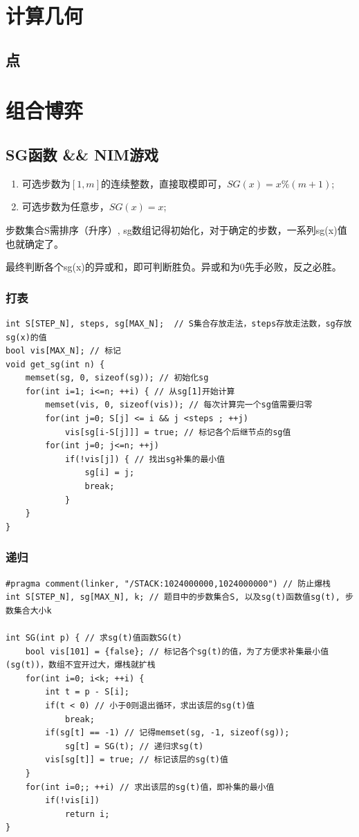 \documentclass[a4paper]{ctexrep}
\begin{document}
\chapter{计算几何}
\section{点}


\chapter{组合博弈}
\section{SG函数 \&\& NIM游戏}
\begin{enumerate}
	\item 可选步数为$[1, m]$的连续整数，直接取模即可，$SG(x)=x\%(m+1)$;
	\item 可选步数为任意步，$SG(x)=x$;
\end{enumerate}

步数集合S需排序（升序）, sg数组记得初始化，对于确定的步数，一系列sg(x)值也就确定了。

最终判断各个sg(x)的异或和，即可判断胜负。异或和为0先手必败，反之必胜。

\subsection{打表}
\begin{lstlisting}
int S[STEP_N], steps, sg[MAX_N];  // S集合存放走法，steps存放走法数，sg存放sg(x)的值
bool vis[MAX_N]; // 标记
void get_sg(int n) {
	memset(sg, 0, sizeof(sg)); // 初始化sg
	for(int i=1; i<=n; ++i) { // 从sg[1]开始计算
		memset(vis, 0, sizeof(vis)); // 每次计算完一个sg值需要归零
		for(int j=0; S[j] <= i && j <steps ; ++j)
			vis[sg[i-S[j]]] = true; // 标记各个后继节点的sg值
		for(int j=0; j<=n; ++j)
			if(!vis[j]) { // 找出sg补集的最小值
				sg[i] = j;
				break;
			}
	}
}
\end{lstlisting}
\subsection{递归}
\begin{lstlisting}
#pragma comment(linker, "/STACK:1024000000,1024000000") // 防止爆栈
int S[STEP_N], sg[MAX_N], k; // 题目中的步数集合S, 以及sg(t)函数值sg(t), 步数集合大小k

int SG(int p) { // 求sg(t)值函数SG(t)
	bool vis[101] = {false}; // 标记各个sg(t)的值，为了方便求补集最小值(sg(t))，数组不宜开过大，爆栈就扩栈
	for(int i=0; i<k; ++i) {
		int t = p - S[i];
		if(t < 0) // 小于0则退出循环，求出该层的sg(t)值
			break;
		if(sg[t] == -1) // 记得memset(sg, -1, sizeof(sg));
			sg[t] = SG(t); // 递归求sg(t)
		vis[sg[t]] = true; // 标记该层的sg(t)值
	}
	for(int i=0;; ++i) // 求出该层的sg(t)值，即补集的最小值
		if(!vis[i])
			return i;
}
\end{lstlisting}
\end{document}
